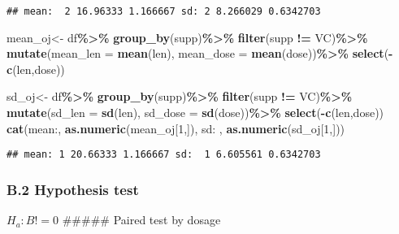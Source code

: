 \documentclass[
]{article}
\newenvironment{Shaded}{\begin{snugshade}}{\end{snugshade}}
\newcommand{\AttributeTok}[1]{\textcolor[rgb]{0.13,0.29,0.53}{#1}}
\newcommand{\DecValTok}[1]{\textcolor[rgb]{0.00,0.00,0.81}{#1}}
\newcommand{\FunctionTok}[1]{\textcolor[rgb]{0.13,0.29,0.53}{\textbf{#1}}}
\newcommand{\NormalTok}[1]{#1}
\newcommand{\OtherTok}[1]{\textcolor[rgb]{0.56,0.35,0.01}{#1}}
\newcommand{\SpecialCharTok}[1]{\textcolor[rgb]{0.81,0.36,0.00}{\textbf{#1}}}
\newcommand{\StringTok}[1]{\textcolor[rgb]{0.31,0.60,0.02}{#1}}
\begin{document}
\begin{verbatim}
## mean:  2 16.96333 1.166667 sd: 2 8.266029 0.6342703
\end{verbatim}

\begin{Shaded}
\begin{Highlighting}[]
\NormalTok{mean\_oj}\OtherTok{\textless{}{-}}
\NormalTok{    df}\SpecialCharTok{\%\textgreater{}\%}
    \FunctionTok{group\_by}\NormalTok{(supp)}\SpecialCharTok{\%\textgreater{}\%}
    \FunctionTok{filter}\NormalTok{(supp }\SpecialCharTok{!=} \StringTok{\textquotesingle{}VC\textquotesingle{}}\NormalTok{)}\SpecialCharTok{\%\textgreater{}\%}
    \FunctionTok{mutate}\NormalTok{(}\AttributeTok{mean\_len =} \FunctionTok{mean}\NormalTok{(len), }\AttributeTok{mean\_dose =} \FunctionTok{mean}\NormalTok{(dose))}\SpecialCharTok{\%\textgreater{}\%}
    \FunctionTok{select}\NormalTok{(}\SpecialCharTok{{-}}\FunctionTok{c}\NormalTok{(len,dose))}

\NormalTok{sd\_oj}\OtherTok{\textless{}{-}}
\NormalTok{    df}\SpecialCharTok{\%\textgreater{}\%}
    \FunctionTok{group\_by}\NormalTok{(supp)}\SpecialCharTok{\%\textgreater{}\%}
    \FunctionTok{filter}\NormalTok{(supp }\SpecialCharTok{!=} \StringTok{\textquotesingle{}VC\textquotesingle{}}\NormalTok{)}\SpecialCharTok{\%\textgreater{}\%}
    \FunctionTok{mutate}\NormalTok{(}\AttributeTok{sd\_len =} \FunctionTok{sd}\NormalTok{(len), }\AttributeTok{sd\_dose =} \FunctionTok{sd}\NormalTok{(dose))}\SpecialCharTok{\%\textgreater{}\%}
    \FunctionTok{select}\NormalTok{(}\SpecialCharTok{{-}}\FunctionTok{c}\NormalTok{(len,dose))}
\FunctionTok{cat}\NormalTok{(}\StringTok{\textquotesingle{}mean:\textquotesingle{}}\NormalTok{, }\FunctionTok{as.numeric}\NormalTok{(mean\_oj[}\DecValTok{1}\NormalTok{,]), }\StringTok{\textquotesingle{}sd: \textquotesingle{}}\NormalTok{,  }\FunctionTok{as.numeric}\NormalTok{(sd\_oj[}\DecValTok{1}\NormalTok{,]))}
\end{Highlighting}
\end{Shaded}

\begin{verbatim}
## mean: 1 20.66333 1.166667 sd:  1 6.605561 0.6342703
\end{verbatim}

\subsubsection{B.2 Hypothesis test}\label{b.2-hypothesis-test}

\(H_a: B!=0\) \#\#\#\#\# Paired test by dosage
\end{document}
